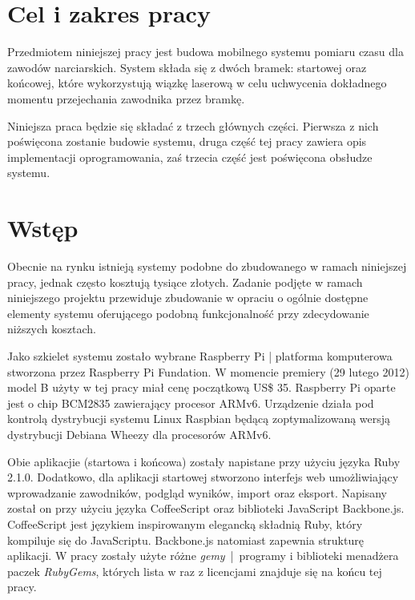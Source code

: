 \documentclass[11pt,a4paper, twoside]{article}
\begin{document}
\sloppy

\tableofcontents

\newpage
\cleardoublepage
\section{Cel i zakres pracy}
Przedmiotem niniejszej pracy jest budowa mobilnego systemu pomiaru czasu dla zawodów narciarskich. System składa się z dwóch bramek: startowej oraz końcowej, które wykorzystują wiązkę laserową w celu uchwycenia dokładnego momentu przejechania zawodnika przez bramkę. 

Niniejsza praca będzie się składać z trzech głównych części. Pierwsza z nich poświęcona zostanie budowie systemu, druga część tej pracy zawiera opis implementacji oprogramowania, zaś trzecia część jest poświęcona obsłudze systemu.

\section{Wstęp}Obecnie na rynku istnieją systemy podobne do zbudowanego w ramach niniejszej pracy, jednak często kosztują tysiące złotych. Zadanie podjęte w ramach niniejszego projektu przewiduje zbudowanie w opraciu o ogólnie dostępne elementy systemu oferującego podobną funkcjonalność przy zdecydowanie niższych kosztach.

Jako szkielet systemu zostało wybrane Raspberry Pi | platforma komputerowa stworzona przez Raspberry Pi Fundation. W momencie premiery (29 lutego 2012) model B użyty w tej pracy miał cenę początkową US\$ 35. Raspberry Pi oparte jest o chip BCM2835 zawierający procesor ARMv6. Urządzenie działa pod kontrolą dystrybucji systemu Linux Raspbian będącą zoptymalizowaną wersją dystrybucji Debiana Wheezy dla procesorów ARMv6.

Obie aplikacjie (startowa i końcowa) zostały napistane przy użyciu języka Ruby 2.1.0. Dodatkowo, dla aplikacji startowej stworzono interfejs web umożliwiający wprowadzanie zawodników, podgląd wyników, import oraz eksport. Napisany został on przy użyciu języka CoffeeScript oraz biblioteki JavaScript Backbone.js. 
CoffeeScript jest językiem inspirowanym elegancką składnią Ruby, który kompiluje się do JavaScriptu. Backbone.js natomiast zapewnia strukturę aplikacji.
\newline
\newline
\noindent
W pracy zostały użyte różne \emph{gemy}~|~programy i biblioteki menadżera paczek \emph{RubyGems}, których lista w raz z licencjami znajduje się na końcu tej pracy.
\newline
\end{document}
